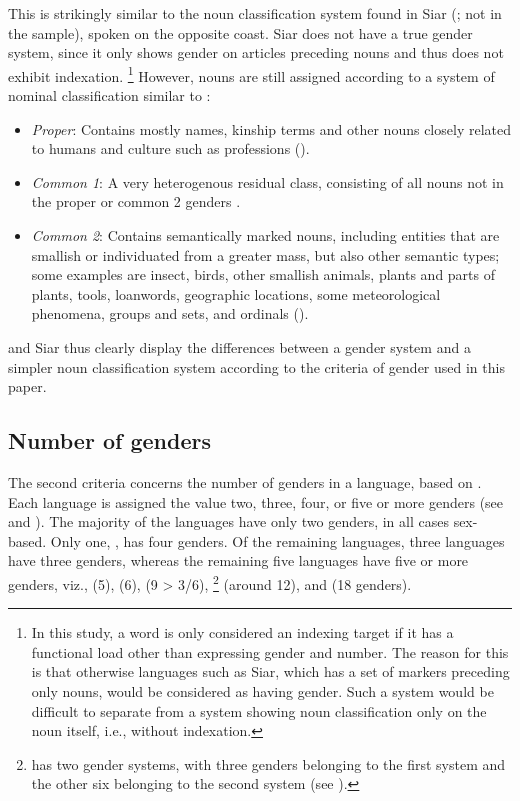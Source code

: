 \documentclass[output=collectionpaper]{langsci/langscibook}
\begin{document}
This is strikingly similar to the noun classification system found in Siar (\citealt{Frowein2011}; not in the sample), spoken on the opposite coast. Siar does not have a true gender system, since it only shows gender on articles preceding nouns and thus does not exhibit indexation.%
\footnote{In this study, a word is only considered an indexing target if it has a functional load other than expressing gender and number. The reason for this is that otherwise languages such as Siar, which has a set of markers preceding only nouns, would be considered as having gender. Such a system would be difficult to separate from a system showing noun classification only on the noun itself, i.e., without indexation.} %
However, nouns are still assigned according to a system of nominal classification similar to :

\begin{itemize}
\item \textit{Proper}: Contains mostly names, kinship terms and other nouns closely related to humans and culture such as professions (\citealt[104--105]{Frowein2011}).

\item \textit{Common 1}: A very heterogenous residual class, consisting of all nouns not in the proper or common 2 genders \citep[108]{Frowein2011}.

\item \textit{Common 2}: Contains semantically marked nouns, including entities that are smallish or individuated from a greater mass, but also other semantic types; some examples are insect, birds, other smallish animals, plants and parts of plants, tools, loanwords, geographic locations, some meteorological phenomena, groups and sets, and ordinals (\citealt[105--107]{Frowein2011}).
\end{itemize}

 and Siar thus clearly display the differences between a gender system and a simpler noun classification system according to the criteria of gender used in this paper.

\subsection{ Number of genders}
\label{sec:Svard:3.2}

The second criteria concerns the number of genders in a language, based on \citet{Corbett2013}. Each language is assigned the value two, three, four, or five or more genders (see  and ). The majority of the languages have only two genders, in all cases sex-based. Only one, , has four genders. Of the remaining languages, three languages have three genders, whereas the remaining five languages have five or more genders, viz.,  (5),  (6),  (9 > 3/6),%
\footnote{ has two gender systems, with three genders belonging to the first system and the other six belonging to the second system (see ).} %
 (around 12), and  (18 genders).
\end{document}
